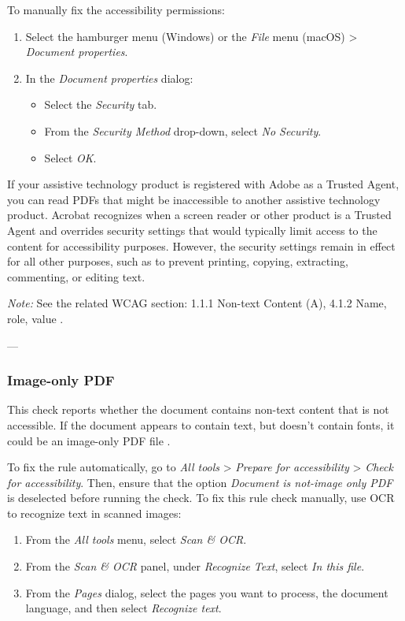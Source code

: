 To manually fix the accessibility permissions:
\begin{enumerate}
    \item Select the hamburger menu (Windows) or the \emph{File} menu (macOS) > \emph{Document properties}.
    \item In the \emph{Document properties} dialog:
    \begin{itemize}
        \item Select the \emph{Security} tab.
        \item From the \emph{Security Method} drop-down, select \emph{No Security}.
        \item Select \emph{OK}.
    \end{itemize}
\end{enumerate}
If your assistive technology product is registered with Adobe as a Trusted Agent, you can read PDFs that might be inaccessible to another assistive technology product. Acrobat recognizes when a screen reader or other product is a Trusted Agent and overrides security settings that would typically limit access to the content for accessibility purposes. However, the security settings remain in effect for all other purposes, such as to prevent printing, copying, extracting, commenting, or editing text\footnotemark[1].

\vspace{0.5em}
\noindent\textit{Note:} See the related WCAG section: 1.1.1 Non-text Content (A), 4.1.2 Name, role, value \cite{WCAG}.

---

\subsubsection{Image-only PDF}
\label{subsubsec:acrobat-image-only}
This check reports whether the document contains non-text content that is not accessible. If the document appears to contain text, but doesn't contain fonts, it could be an image-only PDF file \cite{AdobeHelpX}.

To fix the rule automatically, go to \emph{All tools} > \emph{Prepare for accessibility} > \emph{Check for accessibility}. Then, ensure that the option \emph{Document is not-image only PDF} is deselected before running the check.
To fix this rule check manually, use OCR to recognize text in scanned images:
\begin{enumerate}
    \item From the \emph{All tools} menu, select \emph{Scan \& OCR}.
    \item From the \emph{Scan \& OCR} panel, under \emph{Recognize Text}, select \emph{In this file}.
    \item From the \emph{Pages} dialog, select the pages you want to process, the document language, and then select \emph{Recognize text}.
\end{enumerate}

